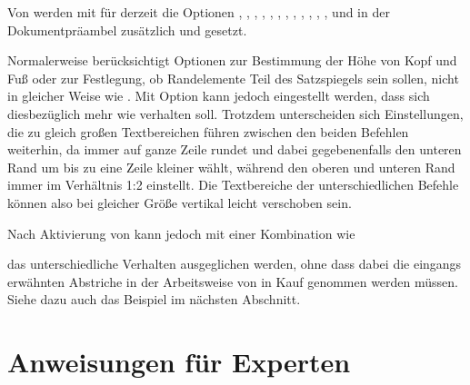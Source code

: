 {\setlength{\emergencystretch}{1em}%
Von  werden mit  für 
derzeit die Optionen
, , ,
, , ,
, , ,
, , , 
und in der Dokumentpräambel zusätzlich  und
 gesetzt.\par}%
\EndIndexGroup


\begin{Declaration}
\end{Declaration}
Normalerweise berücksichtigt  Optionen zur
Bestimmung der Höhe von Kopf und Fuß oder zur Festlegung, ob Randelemente Teil
des Satzspiegels sein sollen, nicht in gleicher Weise wie
. Mit Option
 kann jedoch
eingestellt werden, dass sich  diesbezüglich
mehr wie  verhalten soll. Trotzdem
unterscheiden sich Einstellungen, die zu gleich großen Textbereichen führen
zwischen den beiden Befehlen weiterhin, da 
immer auf ganze Zeile rundet und dabei gegebenenfalls den unteren Rand um bis
zu eine Zeile kleiner wählt, während  den oberen
und unteren Rand immer im Verhältnis 1:2 einstellt.  Die Textbereiche der
unterschiedlichen Befehle können also bei gleicher Größe vertikal leicht
verschoben sein.

Nach Aktivierung von  kann jedoch mit einer
Kombination wie
\begin{lstcode}[escapeinside=><]
\end{lstcode}
das unterschiedliche Verhalten ausgeglichen werden, ohne dass dabei die
eingangs erwähnten Abstriche in der Arbeitsweise von  in Kauf
genommen werden müssen. Siehe dazu auch das Beispiel im nächsten Abschnitt.%
\EndIndexGroup


\section{Anweisungen für Experten}


